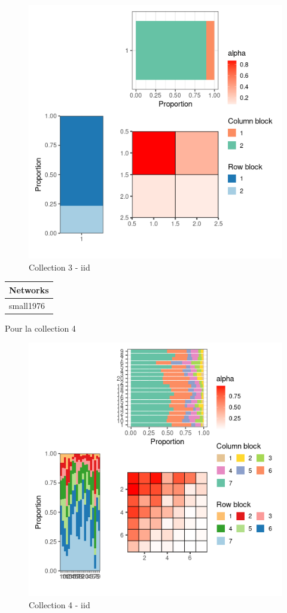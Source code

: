 \begin{figure}
\centering
\includegraphics{figure/iid_meso_plot-3.png}
\caption{Collection 3 - iid}
\end{figure}

\begin{longtable}[]{@{}l@{}}
\toprule
Networks\tabularnewline
\midrule
\endhead
small1976\tabularnewline
\bottomrule
\end{longtable}

Pour la collection 4

\begin{figure}
\centering
\includegraphics{figure/iid_meso_plot-4.png}
\caption{Collection 4 - iid}
\end{figure}

